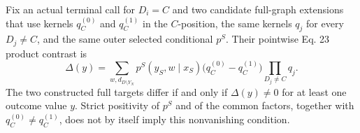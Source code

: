 Fix an actual terminal call for \(D_i=C\) and two candidate full-graph extensions that use kernels \(q_C^{(0)}\) and \(q_C^{(1)}\) in the \(C\)-position, the same kernels \(q_j\) for every \(D_j\ne C\), and the same outer selected conditional \(p^S\). Their pointwise Eq. 23 product contrast is
\[
 \Delta(y)=\sum_{w,d_{D\setminus Y_N}}
 p^S(y_S,w\mid x_S)
 \bigl(q_C^{(0)}-q_C^{(1)}\bigr)
 \prod_{D_j\ne C}q_j.
\]
The two constructed full targets differ if and only if \(\Delta(y)\ne0\) for at least one outcome value \(y\). Strict positivity of \(p^S\) and of the common factors, together with \(q_C^{(0)}\ne q_C^{(1)}\), does not by itself imply this nonvanishing condition.